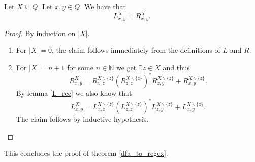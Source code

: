 \begin{lemma}
    \label{L_R}
    Let $X \subseteq Q$. Let $x,y \in Q$. We have that 
    \begin{equation*}
        L^X_{x,y} = R^X_{x,y}.
    \end{equation*}
\end{lemma}
\begin{proof}
    By induction on $|X|$.
    \begin{enumerate}
        \item For $|X| = 0$, the claim follows immediately from the definitions of $L$ and $R$. 
        \item For $|X| = n+1$ for some $n \in \mathbb{N}$ we get $\exists z \in X$ and thus 
            \begin{equation*}
                R^X_{x,y} = R^{X\backslash\{z\}}_{x,z} (R^{X\backslash\{z\}}_{z,z})^* R^{X\backslash\{z\}}_{z,y} 
                + R^{X\backslash\{z\}}_{x,y}.
            \end{equation*}
            By lemma \ref{L_rec} we also know that 
            \begin{equation*}
                L^X_{x,y} = L^{X\backslash\{z\}}_{x,z} (L^{X\backslash\{z\}}_{z,z})^* L^{X\backslash\{z\}}_{z,y}
                + L^{X\backslash\{z\}}_{x,y}.
            \end{equation*}
            The claim follows by inductive hypothesis.
    \end{enumerate}
\end{proof}


This concludes the proof of theorem \ref{dfa_to_regex}.

